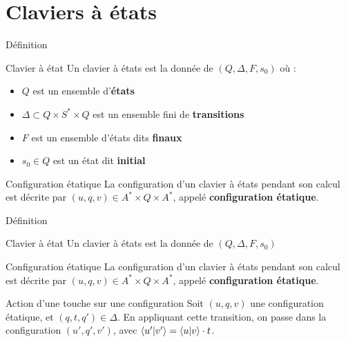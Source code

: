 \documentclass[11pt,french]{beamer}
\begin{document}
\section{Claviers à états}
\begin{frame}{Définition}
	\begin{block}{Clavier à état}
		Un clavier à états est la donnée de $(Q,\Delta ,F,s_0)$ où :
        \begin{itemize}
            \item $Q$ est un ensemble d'\textbf{états}
            \item $\Delta \subset Q \times S^* \times Q$ est un ensemble fini de \textbf{transitions}
            \item $F$ est un ensemble d'états dits \textbf{finaux}
            \item $s_0 \in Q$ est un état dit \textbf{initial}
        \end{itemize}
	\end{block}
	\pause
	\begin{block}{Configuration étatique}
		La configuration d'un clavier à états pendant son calcul est décrite par $(u,q,v) \in A^* \times Q \times A^*$, appelé \textbf{configuration étatique}.
	\end{block}
\end{frame}
\begin{frame}{Définition}
	\begin{block}{Clavier à état}
		Un clavier à états est la donnée de $(Q,\Delta ,F,s_0)$
	\end{block}

	\begin{block}{Configuration étatique}
		La configuration d'un clavier à états pendant son calcul est décrite par $(u,q,v) \in A^* \times Q \times A^*$, appelé \textbf{configuration étatique}.
	\end{block}
	\begin{exampleblock}{Action d'une touche sur une configuration}	
		Soit $(u,q,v)$ une configuration étatique, et $(q,t,q') \in \Delta$. En appliquant cette transition, on passe dans la configuration $(u',q',v')$, avec $\left\langle u' \middle| v' \right\rangle = \left\langle u \middle| v \right\rangle \cdot t$.
	\end{exampleblock}
\end{frame}
\end{document}
